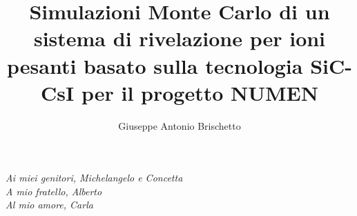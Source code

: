 \documentclass[MSc,italian]{dfaunictthesis}
\begin{document}
\author{Giuseppe Antonio Brischetto}
\title{Simulazioni Monte Carlo di un sistema di rivelazione per ioni pesanti basato sulla tecnologia SiC-CsI per il progetto NUMEN}

\begin{supervisors}
\end{supervisors}


\maketitlepage

\thispagestyle{empty}
\cleardoublepage


\begin{flushright}
	\null {}
	\textit{Ai miei genitori, Michelangelo e Concetta\\}
	\textit{A mio fratello, Alberto\\}
    \textit{Al mio amore, Carla}
     \null
\end{flushright}

\thispagestyle{empty}
\newpage

\thispagestyle{empty}
\cleardoublepage
\tableofcontents

\cleardoublepage
{}
{}
\chapter*{}



\end{document}
